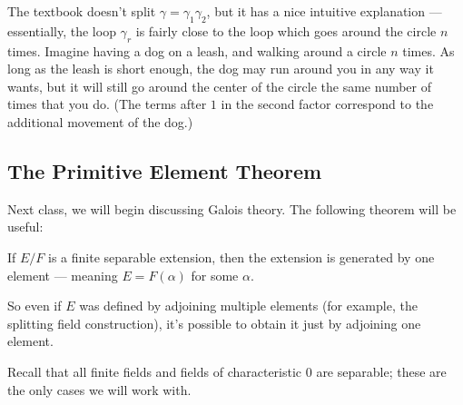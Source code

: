 \begin{note}
The textbook doesn't split $\gamma = \gamma_1\gamma_2$, but it has a nice intuitive explanation --- essentially, the loop $\gamma_r$ is fairly close to the loop which goes around the circle $n$ times. Imagine having a dog on a leash, and walking around a circle $n$ times. As long as the leash is short enough, the dog may run around you in any way it wants, but it will still go around the center of the circle the same number of times that you do. (The terms after $1$ in the second factor correspond to the additional movement of the dog.)
\end{note}

\subsection{The Primitive Element Theorem}

Next class, we will begin discussing Galois theory. The following theorem will be useful: 

\begin{theorem}
    If $E/F$ is a finite separable extension, then the extension is generated by one element --- meaning $E = F(\alpha)$ for some $\alpha$. 
\end{theorem}

So even if $E$ was defined by adjoining multiple elements (for example, the splitting field construction), it's possible to obtain it just by adjoining one element. 

Recall that all finite fields and fields of characteristic $0$ are separable; these are the only cases we will work with.


